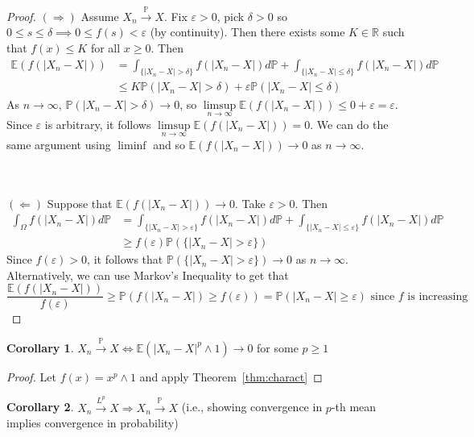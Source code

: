 \documentclass[11pt,a4paper]{article}
\theoremstyle{definition}
\newtheorem{corollary}{Corollary}[section]
\begin{document}
\begin{proof}
$(\Longrightarrow)$ Assume $X_n \xrightarrow{\mathbb{P}} X$. Fix $\varepsilon > 0$, pick $\delta > 0$ so $0 \leq s \le \delta \implies 0 \leq f(s) < \varepsilon$ (by continuity). Then there exists some $K \in \mathbb{R}$ such that $f(x) \le K$ for all $x \ge 0$. Then
\begin{align*}\mathbb{E} (f(|X_n-X|)) & = \int _{\{|X_n - X| > \delta\}}f(|X_n - X|) d\mathbb{P} + \int _{\{|X_n - X| \le \delta\}} f(|X_n - X|) d\mathbb{P} \\  & \leq K \mathbb{P}(|X_n-X| > \delta) + \varepsilon \mathbb{P}(|X_n-X| \leq \delta) \end{align*}
As $n\to\infty$, $\mathbb{P}(|X_n-X| > \delta) \to 0$, so $\limsup \limits _{n \to \infty} \mathbb{E} (f(|X_n-X|)) \leq  0 + \varepsilon = \varepsilon$. Since $\varepsilon$ is arbitrary, it follows $\limsup \limits _{n \to \infty} \mathbb{E} (f(|X_n - X|)) = 0$. We can do the same argument using $\liminf$ and so $\mathbb{E} (f(|X_n-X|)) \to 0$ as $n \to \infty$.

~\\ ~\\ $(\Longleftarrow)$ Suppose that $\mathbb{E} (f(|X_n - X|)) \to 0$. Take $\varepsilon > 0$. Then \begin{align*}
\int _{\Omega} f(|X_n - X|) d \mathbb{P} & = \int _{\{|X_n - X| > \varepsilon \}}f(|X_n - X|) d \mathbb{P} + \int _{\{|X_n - X| \le \varepsilon \}}f(|X_n - X|) d \mathbb{P} \\ & \ge f(\varepsilon) \mathbb{P} (\{|X_n - X| > \varepsilon\}) 
\end{align*}
Since $f(\varepsilon) > 0$, it follows that $\mathbb{P} (\{|X_n - X| > \varepsilon\})  \to 0$ as $n \to \infty$. Alternatively, we can use Markov's Inequality to get that \[
\frac{\mathbb{E} (f(|X_n - X|))}{f(\varepsilon)} \ge \mathbb{P} (f(|X_n - X| ) \ge f(\varepsilon)) = \mathbb{P}(|X_n - X| \ge \varepsilon) \text{ since } f \text{ is increasing}
\]
\end{proof}

\begin{corollary}
    $X_n \xrightarrow{\mathbb{P}} X \iff \mathbb{E} (|X_n-X|^p \land 1)\to 0$ for some $p \geq 1$
\end{corollary}
\begin{proof}
Let $f(x) = x^p \land 1$ and apply Theorem~\ref{thm:charact}
\end{proof}

\begin{corollary} \label{cor:cor1}
    $X_n \xrightarrow{L^p}X \Longrightarrow X_n \xrightarrow{\mathbb{P}} X$ (i.e., showing convergence in $p$-th mean implies convergence in probability)
\end{corollary}
\end{document}

